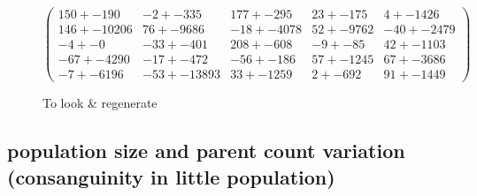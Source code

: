 \documentclass[]{report} %
\begin{document}
    \begin{figure}[H] 
            \centering
            \small
    $
          \begin{pmatrix}
                150 +- 190 & -2 +- 335 & 177 +- 295 & 23 +- 175 & 4 +- 1426 \\
                146 +- 10206 & 76 +- 9686 & -18 +- 4078 & 52 +- 9762 & -40 +- 2479 \\
                -4 +- 0 & -33 +- 401 & 208 +- 608 & -9 +- 85 & 42 +- 1103 \\
                -67 +- 4290 & -17 +- 472 & -56 +- 186 & 57 +- 1245 & 67 +- 3686 \\
                -7 +- 6196 & -53 +- 13893 & 33 +- 1259 & 2 +- 692 & 91 +- 1449 
           \end{pmatrix}
    $
            \caption{\footnotesize To look \& regenerate}
            \label{mat:ps20xg200xmr1-10-4}
    \end{figure}
    
    
    
    \subsection{population size and parent count variation  (consanguinity in little population)}
\end{document}
